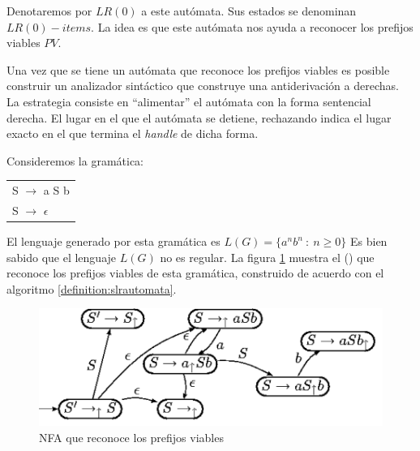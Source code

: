 Denotaremos por $LR(0)$ a este autómata. Sus estados se denominan $LR(0)-items$. La idea es que este
autómata nos ayuda a reconocer los prefijos viables $PV$.

Una vez que se tiene un autómata que reconoce los prefijos viables es posible construir un analizador sintáctico que construye una antiderivación a derechas. La estrategia consiste en ``alimentar'' el autómata con la forma sentencial derecha. El lugar en el que el autómata se detiene, rechazando indica el lugar exacto en el que termina el \emph{handle} de dicha forma.


\begin{example}
\label{example:asb}
Consideremos la gramática:

\vspace{0.5cm}
\begin{center}
\begin{tabular}{l}
S      $\rightarrow$  a S b\\
S      $\rightarrow$ $\epsilon$ 
\end{tabular}
\end{center}
\vspace{0.25cm}

El lenguaje generado por esta gramática es $L(G) = \{ a^n b^n\ :\ n \ge 0 \}$
Es bien sabido que el lenguaje $L(G)$ no es regular.
La figura \ref{fig:nfa} muestra 
el  
()
que reconoce los prefijos viables de esta gramática, construido
de acuerdo con el algoritmo \ref{definition:slrautomata}.


\begin{center}
\begin{figure}[htb]
\centerline{\includegraphics[scale=1.2]{chapter_bottomup/nfa.png}}
\caption{NFA que reconoce los prefijos viables}
\label{fig:nfa}
\end{figure}
\end{center}
\end{example}

